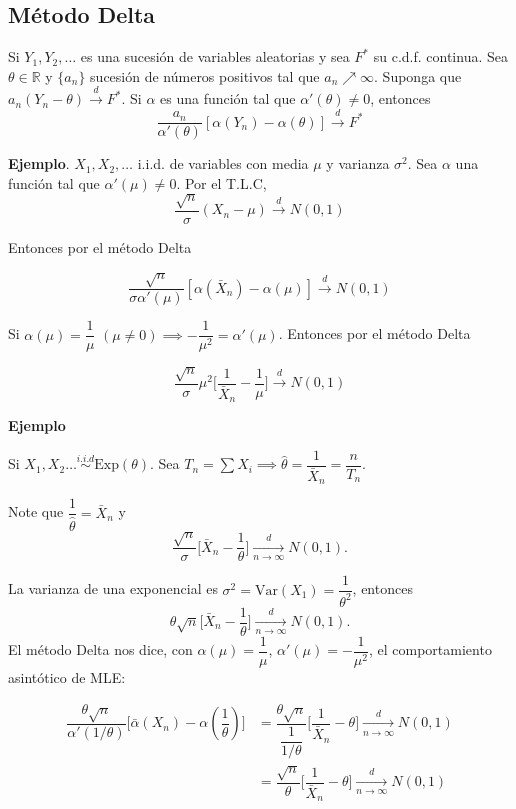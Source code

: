 \documentclass[
  12pt,
]{book}
\begin{document}
\hypertarget{muxe9todo-delta}{%
\subsection{Método Delta}\label{muxe9todo-delta}}

Si \(Y_1,Y_2,\dots\) es una sucesión de variables aleatorias y sea \(F^*\) su c.d.f. continua. Sea \(\theta\in \mathbb R\) y \(\{a_n\}\) sucesión de números positivos tal que \(a_n \nearrow\infty\). Suponga que \(a_n(Y_n-\theta) \xrightarrow{d} F^*\). Si \(\alpha\) es una función tal que \(\alpha'(\theta)\ne 0\), entonces
\[\dfrac{a_n}{\alpha'(\theta)}[\alpha(Y_n)-\alpha(\theta)] \xrightarrow{d} F^*\]

\textbf{Ejemplo}. \(X_1,X_2,\dots\) i.i.d. de variables con media \(\mu\) y varianza \(\sigma^2\). Sea \(\alpha\) una función tal que \(\alpha'(\mu)\neq 0\). Por el T.L.C,
\[ \dfrac{\sqrt{n}}{\sigma}(X_n-\mu)\xrightarrow{d}N(0,1)\]

Entonces por el método Delta

\[ \dfrac{\sqrt{n}}{\sigma\alpha'(\mu)}[\alpha(\bar X_n)-\alpha(\mu)]\xrightarrow{d}N(0,1) \]

Si \(\alpha(\mu) = \dfrac 1\mu\) \((\mu\neq 0) \implies -\dfrac{1}{\mu^2} = \alpha'(\mu)\). Entonces por el método Delta

\[ \dfrac{\sqrt{n}}{\sigma}\mu^2\bigg[\dfrac 1{\bar X_n}-\dfrac 1\mu\bigg]\xrightarrow{d}N(0,1) \]

\textbf{Ejemplo}

Si \(X_1,X_2\dots \stackrel{i.i.d}{\sim} \text{Exp}(\theta)\). Sea \(T_n = \sum X_i \implies \hat\theta = \dfrac 1{\bar X_n} = \dfrac n{T_n}\).

Note que \(\dfrac{1}{\hat{\theta}} = \bar X_n\) y
\[ \dfrac{\sqrt{n}}{\sigma}\bigg[\bar X_n-\dfrac 1\theta\bigg]\xrightarrow[n\to\infty]{d}N(0,1) .\]

La varianza de una exponencial es \(\sigma^2 = \text{Var}(X_1) = \dfrac1{\theta^2}\), entonces
\[ \theta\sqrt{n}\bigg[\bar X_n-\dfrac 1\theta\bigg]\xrightarrow[n\to\infty]{d}N(0,1) .\]
El método Delta nos dice, con \(\alpha(\mu) = \dfrac 1\mu\), \(\alpha'(\mu) = -\dfrac 1{\mu^2}\), el comportamiento asintótico de MLE:

\begin{align*}
\dfrac{\theta\sqrt{n}}{\alpha'(1/\theta)}\bigg[\bar \alpha(X_n)-\alpha\left(\dfrac 1\theta\right)\bigg] 
& = \dfrac{\theta\sqrt{n}}{\dfrac{1}{1/\theta}}\bigg[ \dfrac 1{\bar X_n} -\theta\bigg]\xrightarrow[n\to\infty]{d}N(0,1) \\
& = \dfrac{\sqrt{n}}{\theta}\bigg[\dfrac 1{\bar X_n} -\theta\bigg]\xrightarrow[n\to\infty]{d}N(0,1) 
\end{align*}
\end{document}
